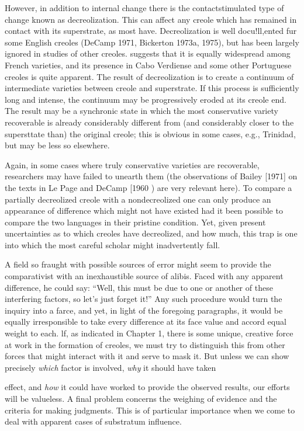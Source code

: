 However, in addition to internal change there is the contact\-stimulated type of change known as decreolization. This can affect any creole which has remained in contact with its superstrate, as most have. Decreolization is well docu!ll,ented fur some English creoles
(DeCamp 1971, Bickerton 1973a, 1975), but has been largely ignored in studies of other creoles. \citet{Valdman1973} suggests that it is equally widespread among French varieties, and its presence in Cabo Verdiense and some other Portuguese creoles is quite apparent. The result of decreolization is to create a continuum of intermediate varieties be\-tween creole and superstrate. If this process is sufficiently long and intense, the continuum may be progressively eroded at its creole end. The result may be a synchronic state in which the most conservative variety recoverable is already considerably different from (and con\-siderably closer to the supersttate than) the original creole; this is obvious in some cases, e.g., Trinidad, but may be less so elsewhere.

Again, in some cases where truly conservative varieties are recoverable, researchers may have failed to unearth them (the obser\-vations of Bailey [1971] on the texts in Le Page and DeCamp [1960 ) are very relevant here). To compare a partially decreolized creole with a nondecreolized one can only produce an appearance of difference which might not have existed had it been possible to compare the two languages in their pristine condition. Yet, given present uncertainties as to which creoles have decreolized, and how much, this trap is one into which the most careful scholar might inadvertently fall.

A field so fraught with possible sources of error might seem to provide the comparativist with an inexhaustible source of alibis. Faced with any apparent difference, he could say: ``Well, this must be due to one or another of these interfering factors, so let's just forget it!'' Any such procedure would turn the inquiry into a farce, and yet, in light of the foregoing paragraphs, it would be equally irresponsible to take every difference at its face value and accord equal weight to each. lf, as indicated in Chapter 1, there is some unique, creative force at work in the formation of creoles, we must try to distinguish this from other forces that might interact with it and serve to mask it. But unless we can show precisely \textit{which} factor is involved, \textit{why} it should have taken

effect, and \textit{how} it could have worked to provide the observed results, our efforts will be valueless.
A final problem concerns the weighing of evidence and the criteria for making judgments. This is of particular importance when we come to deal with apparent cases of substratum influence.

